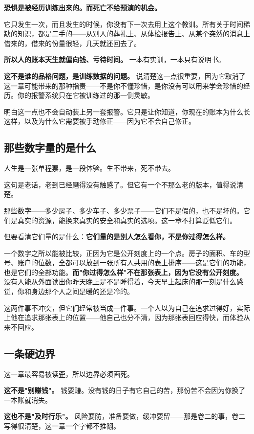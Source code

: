 \documentclass[11pt,a4paper]{ctexart}
\begin{document}
\textbf{恐惧是被经历训练出来的。而死亡不给预演的机会。}

它只发生一次，而且发生的时候，你没有下一次去用上这个教训。所有关于时间稀缺的知识，都是二手的——从别人的葬礼上、从体检报告上、从某个突然的消息上借来的，借来的份量很轻，几天就还回去了。

\textbf{所以人的账本天生就偏向钱、亏待时间。} 一本有实训，一本只有说明书。

\textbf{这不是谁的品格问题，是训练数据的问题。} 说清楚这一点很重要，因为它取消了这一章可能带来的那种指责——不是你不懂珍惜，是你没有可以用来学会珍惜的经历。你的报警系统只在它被训练过的那一侧灵敏。

明白这一点也不会自动装上另一套报警。它只是让你知道，你现在的账本为什么长这样，以及为什么它需要被手动修正——因为它不会自己修正。

\subsection{那些数字量的是什么}

人生是一张单程票，是一段体验。生不带来，死不带去。

这句是老话，老到已经磨得没有触感了。但它有一个不那么老的版本，值得说清楚。

那些数字——多少房子、多少车子、多少票子——它们不是假的，也不是坏的。它们是真实的资源，能换来真实的安全和真实的选项。这一章不打算贬低它们。

但要看清它们量的是什么：\textbf{它们量的是别人怎么看你，不是你过得怎么样。}

一个数字之所以能被比较，正因为它是公开刻度上的一个点。房子的面积、车的型号、账户的位数，全都可以放到一张所有人共用的表上排序——这是它们的功能，也是它们的全部功能。\textbf{而"你过得怎么样"不在那张表上，因为它没有公开刻度。} 没有人能从外面读出你昨天晚上是不是睡得着，今天早上起床的那一刻是什么感觉，你和身边那个人之间是暖的还是冷的。

这两件事不冲突，但它们经常被当成一件事。一个人以为自己在追求过得好，实际上他在追求那张表上的位置——他自己也分不清，因为那张表回应得快，而体验从来不回应。

\subsection{一条硬边界}

这一章最容易被读歪，所以边界必须画死。

\textbf{这不是"别赚钱"。} 钱要赚。没有钱的日子有它自己的苦，那份苦不会因为你换了一本账就消失。

\textbf{这也不是"及时行乐"。} 风险要防，准备要做，缓冲要留——那是卷二的事，卷二写得很清楚，这一章一个字都不推翻。
\end{document}
